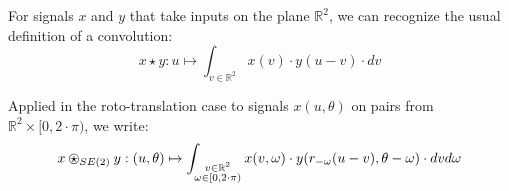                     For signals $x$ and $y$ that take inputs on the plane $\mathbb{R}^2$, we can recognize the usual definition of a convolution:
                    \begin{equation}
                        \label{eq::translation_convolution}
                        x \star y: u \mapsto \int_{v \in \mathbb{R}^2} x(v)\cdot y(u - v) \cdot dv
                    \end{equation}

                    Applied in the roto-translation case to signals $x(u, \theta)$ on pairs from $\mathbb{R}^2 \times [0, 2\cdot\pi)$, we write:
                    \begin{equation}
                        \label{eq::roto-translation_convolution}
                        x \ostar_{SE(2)} y: (u, \theta) \mapsto \int_{\substack{v \in \mathbb{R}^2\\\omega \in [0, 2\cdot\pi)}} x(v, \omega)\cdot y(r_{-\omega}(u - v), \theta - \omega) \cdot dv d\omega
                    \end{equation}
            
